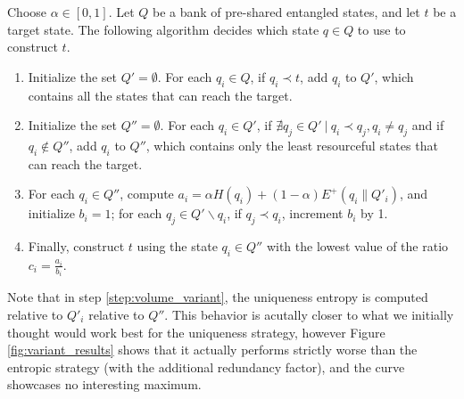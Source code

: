 \begin{appendix_definition} \label{strat:uniqueness_variant}
    Choose $\alpha \in [0, 1]$. Let $Q$ be a bank of pre-shared entangled states, and let $t$ be a target state. The following algorithm decides which state $q \in Q$ to use to construct $t$.
    \begin{enumerate}
        \item Initialize the set $Q' = \emptyset$. For each $q_i \in Q$, if $q_i \prec t$, add $q_i$ to $Q'$, which contains all the states that can reach the target.
        \item Initialize the set $Q'' = \emptyset$. For each $q_i \in Q'$, if $\nexists q_j \in Q' \: | \: q_i \prec q_j, q_i \neq q_j$ and if $q_i \notin Q''$, add $q_i$ to $Q''$, which contains only the least resourceful states that can reach the target.
        \item For each $q_i \in Q''$, compute $a_i = \alpha H(q_i) + (1 - \alpha) E^+(q_i \parallel Q'_i)$, and initialize $b_i = 1$; for each $q_j \in Q' \backslash q_i$, if $q_j \prec q_i$, increment $b_i$ by 1. \label{step:volume_variant}
        \item Finally, construct $t$ using the state $q_i \in Q''$ with the lowest value of the ratio $c_i = \frac{a_i}{b_i}$.
    \end{enumerate}
\end{appendix_definition}

Note that in step \ref{step:volume_variant}, the uniqueness entropy is computed relative to $Q'_i$ relative to $Q''$. This behavior is acutally closer to what we initially thought would work best for the uniqueness strategy, however Figure \ref{fig:variant_results} shows that it actually performs strictly worse than the entropic strategy (with the additional redundancy factor), and the curve showcases no interesting maximum.

